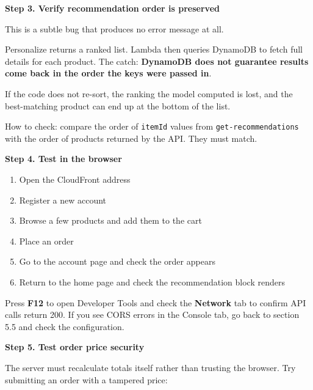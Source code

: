 \vspace{0.5em}\noindent\textbf{Step 3. Verify recommendation order is
preserved}\par

This is a subtle bug that produces no error message at all.

Personalize returns a ranked list. Lambda then queries DynamoDB to fetch
full details for each product. The catch: \textbf{DynamoDB does not
guarantee results come back in the order the keys were passed in}.

If the code does not re-sort, the ranking the model computed is lost,
and the best-matching product can end up at the bottom of the list.

How to check: compare the order of \texttt{itemId} values from
\texttt{get-recommendations} with the order of products returned by the
API. They must match.

\vspace{0.5em}\noindent\textbf{Step 4. Test in the
browser}\par

\begin{enumerate}
\def\labelenumi{\arabic{enumi}.}
\tightlist
\item
  Open the CloudFront address
\item
  Register a new account
\item
  Browse a few products and add them to the cart
\item
  Place an order
\item
  Go to the account page and check the order appears
\item
  Return to the home page and check the recommendation block renders
\end{enumerate}

Press \textbf{F12} to open Developer Tools and check the
\textbf{Network} tab to confirm API calls return 200. If you see CORS
errors in the Console tab, go back to section 5.5 and check the
configuration.

\vspace{0.5em}\noindent\textbf{Step 5. Test order price
security}\par

The server must recalculate totals itself rather than trusting the
browser. Try submitting an order with a tampered price:

\begin{Shaded}
\begin{Highlighting}[]
 \DataTypeTok{\textbackslash{}}
    \DataTypeTok{\textbackslash{}}
    \DataTypeTok{\textbackslash{}}
   
\end{Highlighting}
\end{Shaded}

